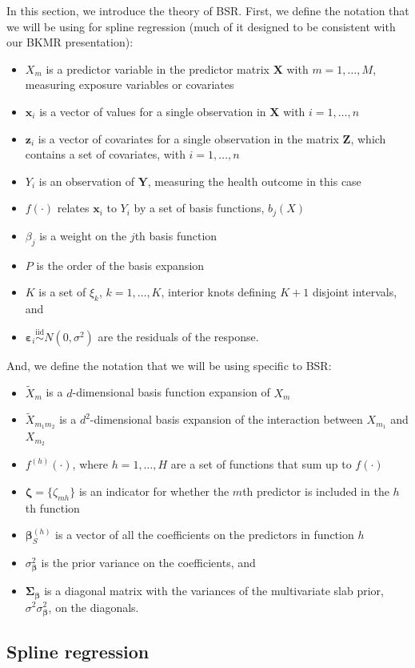 \documentclass[12pt, twoside]{amherstthesis}
\providecommand{\tightlist}{%
  \setlength{\itemsep}{0pt}\setlength{\parskip}{0pt}}
\begin{document}
In this section, we introduce the theory of BSR. First, we define the notation that we will be using for spline regression (much of it designed to be consistent with our BKMR presentation):
\begin{itemize}
\tightlist
\item
  \(X_m\) is a predictor variable in the predictor matrix \(\textbf{X}\) with \(m=1,\dots,M\), measuring exposure variables or covariates
\item
  \(\textbf{x}_i\) is a vector of values for a single observation in \(\textbf{X}\) with \(i=1,\dots,n\)
\item
  \(\textbf{z}_i\) is a vector of covariates for a single observation in the matrix \(\textbf{Z}\), which contains a set of covariates, with \(i = 1, \dots, n\)
\item
  \(Y_i\) is an observation of \(\textbf{Y}\), measuring the health outcome in this case
\item
  \(f(\cdot)\) relates \(\textbf{x}_i\) to \(Y_i\) by a set of basis functions, \(b_j(X)\)
\item
  \(\beta_j\) is a weight on the \(j\)th basis function
\item
  \(P\) is the order of the basis expansion
\item
  \(K\) is a set of \(\xi_k\), \(k=1,\dots,K\), interior knots defining \(K+1\) disjoint intervals, and
\item
  \(\boldsymbol\varepsilon_i \overset{\textrm{iid}}\sim N(0,\sigma^2)\) are the residuals of the response.
\end{itemize}
And, we define the notation that we will be using specific to BSR:
\begin{itemize}
\tightlist
\item
  \(\widetilde{X}_m\) is a \(d\)-dimensional basis function expansion of \(X_m\)
\item
  \(\widetilde{X}_{m_1m_2}\) is a \(d^2\)-dimensional basis expansion of the interaction between \(X_{m_1}\) and \(X_{m_2}\)
\item
  \(f^{(h)}(\cdot)\), where \(h=1,\dots,H\) are a set of functions that sum up to \(f(\cdot)\)
\item
  \(\boldsymbol\zeta = \{\zeta_{mh}\}\) is an indicator for whether the \(m\)th predictor is included in the \(h\)th function
\item
  \(\boldsymbol\beta_S^{(h)}\) is a vector of all the coefficients on the predictors in function \(h\)
\item
  \(\sigma^2_{\boldsymbol\beta}\) is the prior variance on the coefficients, and
\item
  \(\boldsymbol\Sigma_{\boldsymbol\beta}\) is a diagonal matrix with the variances of the multivariate slab prior, \(\sigma^2\sigma^2_{\boldsymbol\beta}\), on the diagonals.
\end{itemize}
\hypertarget{spline-regression}{%
\subsection{Spline regression}\label{spline-regression}}
\end{document}
